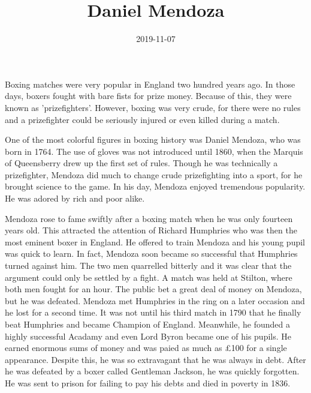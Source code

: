 \documentclass[a4paper,12pt]{article}
\title{Daniel Mendoza}
\author{}
\date{2019-11-07}
\begin{document}
\maketitle

Boxing matches were very popular in England two hundred years ago. In those days, boxers fought with bare fists for prize money. Because of this, they were known as 'prizefighters'. However, boxing was very crude, for there were no rules and a prizefighter could be seriously injured or even killed during a match.

One of the most colorful figures in boxing history was Daniel Mendoza, who was born in 1764. The use of gloves was not introduced until 1860, when the Marquis of Queensberry drew up the first set of rules. Though he was technically a prizefighter, Mendoza did much to change crude prizefighting into a sport, for he brought science to the game. In his day, Mendoza enjoyed tremendous popularity. He was adored by rich and poor alike.

Mendoza rose to fame swiftly after a boxing match when he was only fourteen years old. This attracted the attention of Richard Humphries who was then the most eminent boxer in England. He offered to train Mendoza and his young pupil was quick to learn. In fact, Mendoza soon became so successful that Humphries turned against him. The two men quarrelled bitterly and it was clear that the argument could only be settled by a fight. A match was held at Stilton, where both men fought for an hour. The public bet a great deal of money on Mendoza, but he was defeated. Mendoza met Humphries in the ring on a later occasion and he lost for a second time. It was not until his third match in 1790 that he finally beat Humphries and became Champion of England. Meanwhile, he founded a highly successful Acadamy and even Lord Byron became one of his pupils. He earned enormous sums of money and was paied as much as \pounds 100 for a single appearance. Despite this, he was so extravagant that he was always in debt. After he was defeated by a boxer called Gentleman Jackson, he was quickly forgotten. He was sent to prison for failing to pay his debts and died in poverty in 1836.
\end{document}
